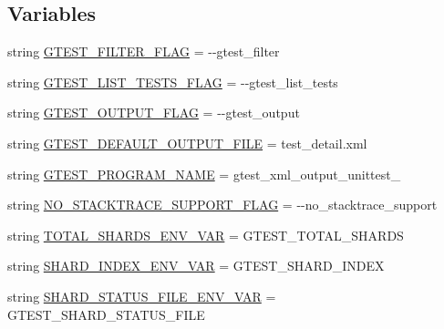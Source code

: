 \subsection*{Variables}
\begin{DoxyCompactItemize}
\item 
string \mbox{\hyperlink{namespacegtest__xml__output__unittest_ab914acfbfbc3f6f5ee3f1e83134c7204}{G\+T\+E\+S\+T\+\_\+\+F\+I\+L\+T\+E\+R\+\_\+\+F\+L\+AG}} = \textquotesingle{}-\/-\/gtest\+\_\+filter\textquotesingle{}
\item 
string \mbox{\hyperlink{namespacegtest__xml__output__unittest_aafe4dd234e72bbb61f4f34689fbca5c4}{G\+T\+E\+S\+T\+\_\+\+L\+I\+S\+T\+\_\+\+T\+E\+S\+T\+S\+\_\+\+F\+L\+AG}} = \textquotesingle{}-\/-\/gtest\+\_\+list\+\_\+tests\textquotesingle{}
\item 
string \mbox{\hyperlink{namespacegtest__xml__output__unittest_a96dc60b3ea1b2ced315835227f77e10d}{G\+T\+E\+S\+T\+\_\+\+O\+U\+T\+P\+U\+T\+\_\+\+F\+L\+AG}} = \textquotesingle{}-\/-\/gtest\+\_\+output\textquotesingle{}
\item 
string \mbox{\hyperlink{namespacegtest__xml__output__unittest_a5591d7d52a46da09d06ed3e9ec18711a}{G\+T\+E\+S\+T\+\_\+\+D\+E\+F\+A\+U\+L\+T\+\_\+\+O\+U\+T\+P\+U\+T\+\_\+\+F\+I\+LE}} = \textquotesingle{}test\+\_\+detail.\+xml\textquotesingle{}
\item 
string \mbox{\hyperlink{namespacegtest__xml__output__unittest_ab89cc5b402310ef67bcaf38fa5017461}{G\+T\+E\+S\+T\+\_\+\+P\+R\+O\+G\+R\+A\+M\+\_\+\+N\+A\+ME}} = \textquotesingle{}gtest\+\_\+xml\+\_\+output\+\_\+unittest\+\_\+\textquotesingle{}
\item 
string \mbox{\hyperlink{namespacegtest__xml__output__unittest_a1e97a1796a1c452a4ab5fc2f8d422914}{N\+O\+\_\+\+S\+T\+A\+C\+K\+T\+R\+A\+C\+E\+\_\+\+S\+U\+P\+P\+O\+R\+T\+\_\+\+F\+L\+AG}} = \textquotesingle{}-\/-\/no\+\_\+stacktrace\+\_\+support\textquotesingle{}
\item 
string \mbox{\hyperlink{namespacegtest__xml__output__unittest_ae142e1cf52c8d9b76d98a2a7376a2649}{T\+O\+T\+A\+L\+\_\+\+S\+H\+A\+R\+D\+S\+\_\+\+E\+N\+V\+\_\+\+V\+AR}} = \textquotesingle{}G\+T\+E\+S\+T\+\_\+\+T\+O\+T\+A\+L\+\_\+\+S\+H\+A\+R\+DS\textquotesingle{}
\item 
string \mbox{\hyperlink{namespacegtest__xml__output__unittest_a694b1514d77c5903d21a834a38eb3aef}{S\+H\+A\+R\+D\+\_\+\+I\+N\+D\+E\+X\+\_\+\+E\+N\+V\+\_\+\+V\+AR}} = \textquotesingle{}G\+T\+E\+S\+T\+\_\+\+S\+H\+A\+R\+D\+\_\+\+I\+N\+D\+EX\textquotesingle{}
\item 
string \mbox{\hyperlink{namespacegtest__xml__output__unittest_ac9dcd4fb8221494dd29d00bdf41f4e80}{S\+H\+A\+R\+D\+\_\+\+S\+T\+A\+T\+U\+S\+\_\+\+F\+I\+L\+E\+\_\+\+E\+N\+V\+\_\+\+V\+AR}} = \textquotesingle{}G\+T\+E\+S\+T\+\_\+\+S\+H\+A\+R\+D\+\_\+\+S\+T\+A\+T\+U\+S\+\_\+\+F\+I\+LE\textquotesingle{}

\end{DoxyCompactItemize}

